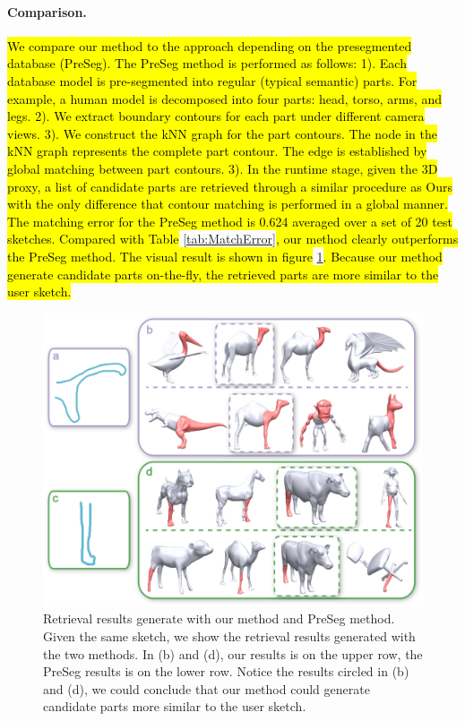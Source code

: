 \paragraph*{Comparison.}\hl{ We compare our method to the approach depending on the presegmented database (PreSeg). The PreSeg method is performed as follows: 1). Each database model is pre-segmented into regular (typical semantic) parts. For example, a human model is decomposed into four parts: head, torso, arms, and legs. 2). We extract boundary contours for each part under different camera views. 3). We construct the kNN graph for the part contours. The node in the kNN graph represents the complete part contour. The edge is established by global matching between part contours. 3). In the runtime stage, given the 3D proxy, a list of candidate parts are retrieved through a similar procedure as Ours with the only difference that contour matching is performed in a global manner. The matching error for the PreSeg method is 0.624 averaged over a set of 20 test sketches. Compared with Table }\ref{tab:MatchError}\hl{, our method clearly outperforms the PreSeg method. The visual result is shown in figure }\ref{fig:Comp2PreSeg}\hl{. Because our method generate candidate parts on-the-fly, the retrieved parts are more similar to the user sketch.}
\begin{figure}\centering
\includegraphics[width=1.0\linewidth]{./Material/Comp2PreSeg.pdf}
\caption{Retrieval results generate with our method and PreSeg method. Given the same sketch, we show the retrieval results generated with the two methods.
In (b) and (d), our results is on the upper row, the PreSeg results is on the lower row. Notice the results circled in (b) and (d), we could conclude that our method could generate candidate parts more similar to the user sketch.}\label{fig:Comp2PreSeg}
\end{figure}

